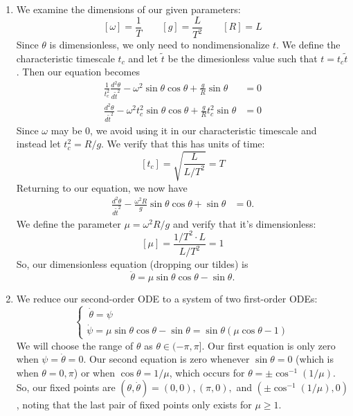 \documentclass[10pt,letterpaper]{report}
\begin{document}
\begin{enumerate}
\begin{enumerate}
    \item We examine the dimensions of our given parameters:
    \[
    [\omega] = \frac{1}{T} \qquad [g] = \frac{L}{T^2} \qquad [R] = L
    \]
    Since $\theta$ is dimensionless, we only need to nondimensionalize $t$. We define the characteristic timescale $t_c$ and let $\widetilde t$ be the dimesionless value such that $t = t_c\widetilde t$. Then our equation becomes
    \begin{align*}
        \frac{1}{t_c^2} \frac{d^2\theta}{d\widetilde t^2} - \omega^2 \sin\theta \cos\theta + \frac{g}{R}\sin\theta 
        &= 
        0
        \\
        \frac{d^2\theta}{d\widetilde t^2} - \omega^2 t_c^2 \sin\theta \cos\theta + \frac{g}{R}t_c^2\sin\theta 
        &= 
        0
    \end{align*}
    Since $\omega$ may be 0, we avoid using it in our characteristic timescale and instead let $t_c^2 = R/g$. We verify that this has units of time:
    \[
    [t_c] = \sqrt{\frac{L}{L/T^2}} = T
    \]
    Returning to our equation, we now have
    \begin{align*}
        \frac{d^2\theta}{d\widetilde t^2} - \frac{\omega^2R}{g} \sin\theta \cos\theta + \sin\theta 
        &= 
        0.
    \end{align*}
    We define the parameter $\mu = \omega^2R/g$ and verify that it's dimensionless:
    \[
    [\mu] = \frac{1/T^2 \cdot L}{L/T^2} = 1
    \]
    So, our dimensionless equation (dropping our tildes) is
    \[
    \ddot \theta = \mu\sin\theta\cos\theta - \sin\theta.
    \]
    
    \item We reduce our second-order ODE to a system of two first-order ODEs:
    \[
    \begin{cases}
    \: \dot \theta = \psi \\
    \dot \psi = \mu \sin\theta\cos\theta - \sin\theta = \sin\theta(\mu\cos\theta - 1)
    \end{cases}
    \]
    We will choose the range of $\theta$ as $\theta \in (-\pi, \pi]$. Our first equation is only zero when $\psi = \dot\theta = 0$. Our second equation is zero whenever $\sin\theta = 0$ (which is when $\theta = 0, \pi$) or when $\cos\theta = 1/\mu$, which occurs for $\theta = \pm\cos^{-1}(1/\mu)$. 
    So, our fixed points are $(\theta, \dot \theta ) = (0, 0), (\pi, 0),$ and $(\pm\cos^{-1}(1/\mu), 0)$, noting that the last pair of fixed points only exists for $\mu \geq 1$.
    

\end{enumerate}
\end{enumerate}
\end{document}
